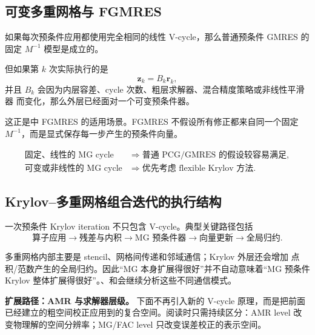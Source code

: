 \subsection{可变多重网格与 FGMRES}

如果每次预条件应用都使用完全相同的线性 V-cycle，那么普通预条件 GMRES 的固定 $M^{-1}$ 模型是成立的。

但如果第 $k$ 次实际执行的是
\begin{equation}
\bm z_k
=
B_k\bm r_k,
\end{equation}
并且 $B_k$ 会因为内层容差、cycle 次数、粗层求解器、混合精度策略或非线性平滑器 而变化，那么外层已经面对一个可变预条件器。

这正是中 FGMRES 的适用场景。FGMRES 不假设所有修正都来自同一个固定 $M^{-1}$，而是显式保存每一步产生的预条件向量。

\begin{keybox}
\[
\boxed{
\begin{aligned}
\text{固定、线性的 MG cycle}
&\Rightarrow
\text{普通 PCG/GMRES 的假设较容易满足},\\
\text{可变或非线性的 MG cycle}
&\Rightarrow
\text{优先考虑 flexible Krylov 方法}.
\end{aligned}
}
\]
\end{keybox}

\subsection{Krylov--多重网格组合迭代的执行结构}

一次预条件 Krylov iteration 不只包含 V-cycle。典型关键路径包括
\begin{equation}
\boxed{
\text{算子应用}
\rightarrow
\text{残差与内积}
\rightarrow
\text{MG 预条件器}
\rightarrow
\text{向量更新}
\rightarrow
\text{全局归约}.
}
\label{eq:preconditioner-krylov-execution-flow}
\end{equation}

多重网格内部主要是 stencil、网格间传递和邻域通信；Krylov 外层还会增加 点积/范数产生的全局归约。因此“MG 本身扩展得很好”并不自动意味着“MG 预条件 Krylov 整体扩展得很好”。、和会继续分析这些不同通信模式。



\begin{keybox}
\textbf{扩展路径：AMR 与求解器层级。}
下面不再引入新的 V-cycle 原理，而是把前面已经建立的粗空间校正应用到的复合空间。阅读时只需持续区分：AMR level 改变物理解的空间分辨率；MG/FAC level 只改变误差校正的表示空间。
\end{keybox}

